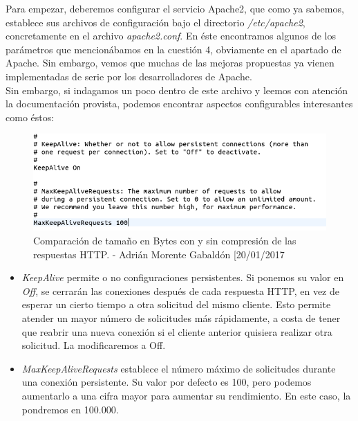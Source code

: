 Para empezar, deberemos configurar el servicio Apache2, que como ya sabemos, establece sus archivos de configuración bajo el directorio \emph{/etc/apache2}, concretamente en el archivo \emph{apache2.conf}. En éste encontramos algunos de los parámetros que mencionábamos en la cuestión 4, obviamente en el apartado de Apache. Sin embargo, vemos que muchas de las mejoras propuestas ya vienen implementadas de serie por los desarrolladores de Apache.\\

Sin embargo, si indagamos un poco dentro de este archivo y leemos con atención la documentación provista, podemos encontrar aspectos configurables interesantes como éstos:
\begin{figure}[H]
	\centering
	\includegraphics[scale=0.6]{apache2-conf1}
	\caption{Comparación de tamaño en Bytes con y sin compresión de las respuestas HTTP. - Adrián Morente Gabaldón [20/01/2017}
	\label{figura19}
\end{figure}

\begin{itemize}
	\item \emph{KeepAlive} permite o no configuraciones persistentes. Si ponemos su valor en \emph{Off}, se cerrarán las conexiones después de cada respuesta HTTP, en vez de esperar un cierto tiempo a otra solicitud del mismo cliente. Esto permite atender un mayor número de solicitudes más rápidamente, a costa de tener que reabrir una nueva conexión si el cliente anterior quisiera realizar otra solicitud. La modificaremos a Off.
	\item \emph{MaxKeepAliveRequests} establece el número máximo de solicitudes durante una conexión persistente. Su valor por defecto es 100, pero podemos aumentarlo a una cifra mayor para aumentar su rendimiento. En este caso, la pondremos en 100.000.
\end{itemize}

